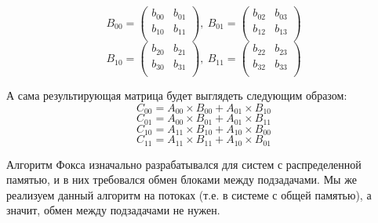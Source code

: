 \documentclass{article}
\begin{document}
\par
\[B_{00}= \left(
  \begin{matrix}
    b_{00}  &  b_{01}\\
    b_{10}  &  b_{11}\\
  \end{matrix}
\right),
~B_{01}= \left(
  \begin{matrix}
    b_{02}  &   b_{03}\\
    b_{12}  &   b_{13}\\
  \end{matrix}
\right)\]
\[B_{10}= \left(
  \begin{matrix}
    b_{20}  &  b_{21}\\
    b_{30}  &  b_{31}\\
  \end{matrix}
\right),
~B_{11}= \left(
  \begin{matrix}
    b_{22}  &  b_{23}\\
    b_{32}  &  b_{33}\\
  \end{matrix}
\right)\] 

\par
А сама результирующая матрица будет выглядеть следующим образом:
\[C_{00} = A_{00} \times B_{00} + A_{01} \times B_{10}\]
\[C_{01} = A_{00} \times B_{01} + A_{01} \times B_{11}\]
\[C_{10} = A_{11} \times B_{10} + A_{10} \times B_{00}\]
\[C_{11} = A_{11} \times B_{11} + A_{10} \times B_{01}\]

\par
Алгоритм Фокса изначально разрабатывался для систем с распределенной памятью, и в них требовался обмен блоками между подзадачами.
Мы же реализуем данный алгоритм на потоках (т.е. в системе с общей памятью), а значит, обмен между подзадачами не нужен.
\newpage

\end{document}
